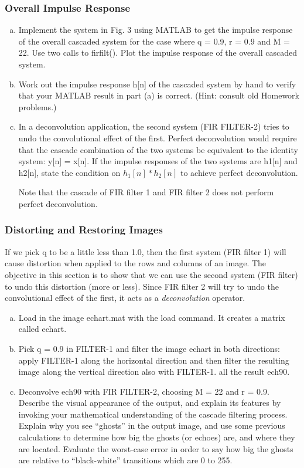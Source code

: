 \subsubsection{Overall Impulse Response}
\begin{enumerate}[a)]
\item Implement the system in Fig. 3 using MATLAB to get the impulse response of the overall cascaded system for the case where q = 0.9, r = 0.9 and M = 22. Use two calls to firfilt(). Plot the
	impulse response of the overall cascaded system.
	
\item Work out the impulse response h[n] of the cascaded system by hand to verify that your MATLAB
	result in part (a) is correct. (Hint: consult old Homework problems.)

\item In a deconvolution application, the second system (FIR FILTER-2) tries to undo the convolutional effect of the first. Perfect deconvolution would require that the cascade combination of the two systems
	be equivalent to the identity system: y[n] = x[n]. If the impulse responses of the two systems are
	h1[n] and h2[n], state the condition on $h_1[n] * h_2[n]$ to achieve perfect deconvolution.
	
	Note that the cascade of FIR filter 1 and FIR filter 2 does not perform perfect deconvolution.	
\end{enumerate}


\subsubsection{Distorting and Restoring Images}
If we pick q to be a little less than 1.0, then the first system (FIR filter 1) will cause distortion when applied to the rows and columns of an image. The objective in this section is to show that we can use the second system (FIR filter) to undo this distortion (more or less). Since FIR filter 2 will try to undo the convolutional effect of the first, it acts as a \emph{deconvolution} operator.

\begin{enumerate}[a)]
\item Load in the image echart.mat with the load command. It creates a matrix called echart.
	
\item Pick q = 0.9 in FILTER-1 and filter the image echart in both directions: apply FILTER-1 along the
	horizontal direction and then filter the resulting image along the vertical direction also with FILTER-1. all the result ech90.
	
\item Deconvolve ech90 with FIR FILTER-2, choosing M = 22 and r = 0.9. 
	Describe the visual appearance of the output, and explain its features by invoking your mathematical understanding of the cascade filtering process. Explain why you see “ghosts” in the output image, and use some previous calculations to determine how big the ghosts (or echoes) are, and where they are located. Evaluate the worst-case error in order to say how big the ghosts are relative to “black-white” transitions which are 0 to 255.
\end{enumerate}

